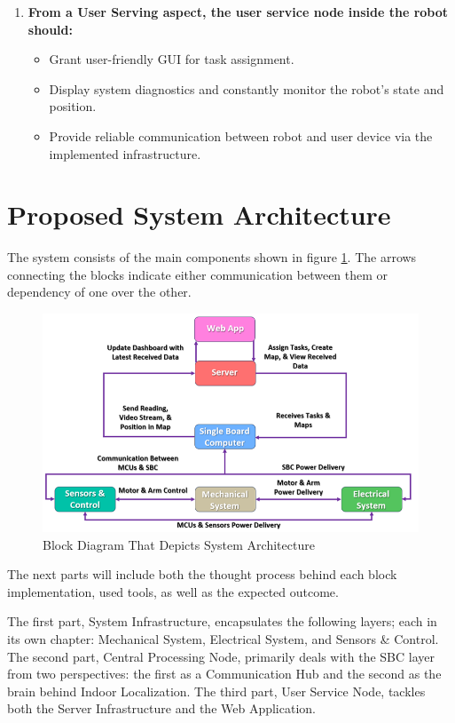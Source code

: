 \begin{enumerate}
\begin{itemize}
            \end{itemize}
    \item \textbf{From a User Serving aspect, the user service node inside the robot should:}
            \begin{itemize}
                \item Grant user-friendly GUI for task assignment.
                \item Display system diagnostics and constantly monitor the robot's state and position.
                \item Provide reliable communication between robot and user device via the implemented infrastructure.
                
            \end{itemize}
\end{enumerate}

\newpage

\section{Proposed System Architecture}
The system consists of the main components shown in figure \ref{fig:sysarch}. The arrows connecting the blocks indicate either communication between them or dependency of one over the other.
\begin{figure}[h!]
	\centering
	\includegraphics[scale=0.7]{./Figures/sysarch.PNG}
	\caption{Block Diagram That Depicts System Architecture}
	\label{fig:sysarch}
\end{figure}

The next parts will include both the thought process behind each block implementation, used tools, as well as the expected outcome.

The first part, System Infrastructure, encapsulates the following layers; each in its own chapter: Mechanical System, Electrical System, and Sensors \& Control. The second part, Central Processing Node, primarily deals with the SBC layer from two perspectives: the first as a Communication Hub and the second as the brain behind Indoor Localization. The third part, User Service Node, tackles both the Server Infrastructure and the Web Application.


